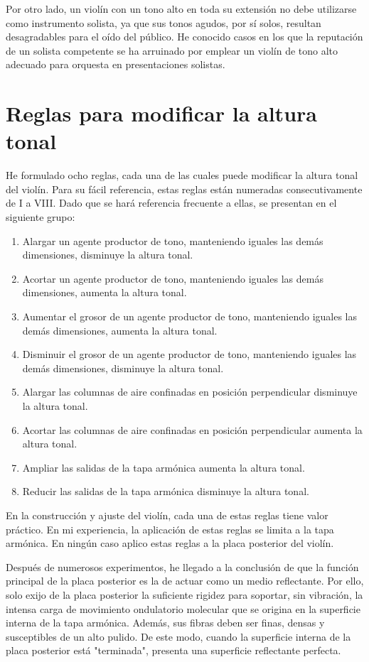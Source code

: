 \documentclass[12pt]{book}
\begin{document}
Por otro lado, un violín con un tono alto en toda su extensión no debe utilizarse como instrumento solista, ya que sus tonos agudos, por sí solos, resultan desagradables para el oído del público. He conocido casos en los que la reputación de un solista competente se ha arruinado por emplear un violín de tono alto adecuado para orquesta en presentaciones solistas.

\section*{Reglas para modificar la altura tonal}

He formulado ocho reglas, cada una de las cuales puede modificar la altura tonal del violín. Para su fácil referencia, estas reglas están numeradas consecutivamente de I a VIII. Dado que se hará referencia frecuente a ellas, se presentan en el siguiente grupo:

\begin{enumerate}
  \item Alargar un agente productor de tono, manteniendo iguales las demás dimensiones, disminuye la altura tonal.
  \item Acortar un agente productor de tono, manteniendo iguales las demás dimensiones, aumenta la altura tonal.
  \item Aumentar el grosor de un agente productor de tono, manteniendo iguales las demás dimensiones, aumenta la altura tonal.
  \item Disminuir el grosor de un agente productor de tono, manteniendo iguales las demás dimensiones, disminuye la altura tonal.
  \item Alargar las columnas de aire confinadas en posición perpendicular disminuye la altura tonal.
  \item Acortar las columnas de aire confinadas en posición perpendicular aumenta la altura tonal.
  \item Ampliar las salidas de la tapa armónica aumenta la altura tonal.
  \item Reducir las salidas de la tapa armónica disminuye la altura tonal.
\end{enumerate}

En la construcción y ajuste del violín, cada una de estas reglas tiene valor práctico. En mi experiencia, la aplicación de estas reglas se limita a la tapa armónica. En ningún caso aplico estas reglas a la placa posterior del violín.

Después de numerosos experimentos, he llegado a la conclusión de que la función principal de la placa posterior es la de actuar como un medio reflectante. Por ello, solo exijo de la placa posterior la suficiente rigidez para soportar, sin vibración, la intensa carga de movimiento ondulatorio molecular que se origina en la superficie interna de la tapa armónica. Además, sus fibras deben ser finas, densas y susceptibles de un alto pulido. De este modo, cuando la superficie interna de la placa posterior está "terminada", presenta una superficie reflectante perfecta.
\end{document}
